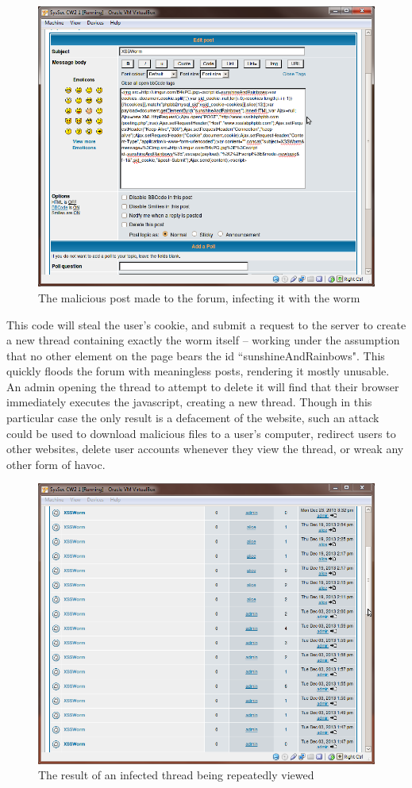 \begin{figure}[h]
    \centering
    \includegraphics[width=.8\linewidth]{images/sunshine_and_rainbows.png}
    \caption{The malicious post made to the forum, infecting it with the worm}
\end{figure}

This code will steal the user's cookie, and submit a request to the server to create a new thread containing exactly the
worm itself -- working under the assumption that no other element on the page bears the id ``sunshineAndRainbows". This
quickly floods the forum with meaningless posts, rendering it mostly unusable. An admin opening the thread to attempt to
delete it will find that their browser immediately executes the javascript, creating a new thread. Though in this
particular case the only result is a defacement of the website, such an attack could be used to download malicious files
to a user's computer, redirect users to other websites, delete user accounts whenever they view the thread, or wreak any
other form of havoc.

\begin{figure}[h]
    \centering
    \includegraphics[width=.8\linewidth]{images/xss_victory.png}
    \caption{The result of an infected thread being repeatedly viewed}
\end{figure}

